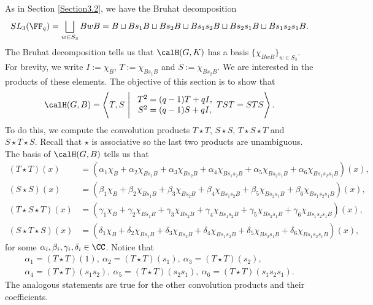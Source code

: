 \documentclass[11pt]{amsart}
\theoremstyle{remark}
\begin{document}
As in Section \ref{Section3.2}, we have the Bruhat decomposition
\[
	SL_3(\FF_q)=\bigsqcup_{w\in S_3} BwB = B \sqcup Bs_1B \sqcup Bs_2B \sqcup Bs_1s_2B \sqcup Bs_2s_1B \sqcup Bs_1s_2s_1B.
\]
The Bruhat decomposition tells us that $\calH(G,K)$ has a basis $\{\chi_{BwB}\}_{w\in S_3}$.
For brevity, we write $I:=\chi_B$, $T:= \chi_{Bs_1B}$ and $S:= \chi_{Bs_2B}$.
We are interested in the products of these elements.
The objective of this section is to show that
\[
	\calH(G,B) = \left\langle T,S\ \Bigg|\ \begin{array}{c}
		T^2 = (q-1)T + qI, \\
		S^2=(q-1)S+qI,
	\end{array}TST=STS\right\rangle.
\]
To do this, we compute the convolution products $T\star T$, $S\star S$, $T\star S\star T$ and $S\star T\star S$.
Recall that $\star$ is associative so the last two products are unambiguous.
The basis of $\calH(G,B)$ tells us that
\begin{align*}
	(T\star T)(x)        & = (\alpha_1 \chi_B + \alpha_2\chi_{Bs_1B} + \alpha_3 \chi_{Bs_2B} + \alpha_4\chi_{Bs_1s_2B} + \alpha_5\chi_{Bs_2s_1B} + \alpha_6\chi_{Bs_1s_2s_1B})(x), \\
	(S\star S)(x)        & = (\beta_1 \chi_B + \beta_2\chi_{Bs_1B} + \beta_3 \chi_{Bs_2B} + \beta_4\chi_{Bs_1s_2B} + \beta_5\chi_{Bs_2s_1B} + \beta_6\chi_{Bs_1s_2s_1B})(x),       \\
	(T\star S\star T)(x) & = (\gamma_1 \chi_B + \gamma_2\chi_{Bs_1B} + \gamma_3 \chi_{Bs_2B} + \gamma_4\chi_{Bs_1s_2B} + \gamma_5\chi_{Bs_2s_1B} + \gamma_6\chi_{Bs_1s_2s_1B})(x), \\
	(S\star T\star S)(x) & = (\delta_1 \chi_B + \delta_2\chi_{Bs_1B} + \delta_3 \chi_{Bs_2B} + \delta_4\chi_{Bs_1s_2B} + \delta_5\chi_{Bs_2s_1B} + \delta_6\chi_{Bs_1s_2s_1B})(x),
\end{align*}
for some $\alpha_i, \beta_i, \gamma_i, \delta_i \in\CC$.
Notice that
\begin{multline*}
	\alpha_1 = (T\star T)(1),\ \alpha_2 = (T\star T)(s_1),\ \alpha_3 = (T\star T)(s_2), \\
	\alpha_4 = (T\star T)(s_1s_2),\ \alpha_5 = (T\star T)(s_2s_1),\ \alpha_6 = (T\star T)(s_1s_2s_1).
\end{multline*}
The analogous statements are true for the other convolution products and their coefficients.
\end{document}
